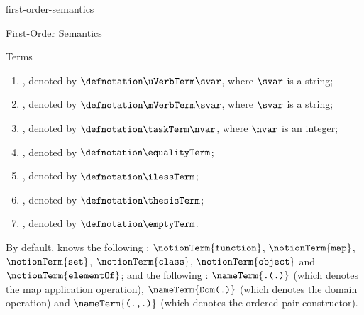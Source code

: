 \documentclass{stex}
\begin{document}
\begin{smodule}{first-order-semantics}
\begin{sfragment}[id=sec:first-order-semantics]{First-Order Semantics}
\begin{sfragment}[id=sec:terms]{Terms}
\begin{sparagraph}[style=symdoc,for={term name,nameTerm,symbolicTerm,theTerm,uAdjectiveTerm,mAdjectiveTerm,
    uVerbTerm,mVerbTerm,taskTerm,equalityTerm,ilessTerm,thesisTerm,emptyTerm}]
\begin{enumerate}
          where $\svar$ is a string;
        \item {}, denoted by $\defnotation\uVerbTerm\svar$,
          where $\svar$ is a string;
        \item {}, denoted by $\defnotation\mVerbTerm\svar$,
          where $\svar$ is a string;
        \item {}, denoted by $\defnotation\taskTerm\nvar$,
          where $\nvar$ is an integer;
        \item {}, denoted by $\defnotation\equalityTerm$;
        \item {}, denoted by $\defnotation\ilessTerm$;
        \item {}, denoted by $\defnotation\thesisTerm$;
        \item {}, denoted by $\defnotation\emptyTerm$.
      \end{enumerate}
    \end{sparagraph}

    By default, \Naproche knows the following :
    $\notionTerm{\texttt{function}}$,
    $\notionTerm{\texttt{map}}$,
    $\notionTerm{\texttt{set}}$,
    $\notionTerm{\texttt{class}}$,
    $\notionTerm{\texttt{object}}$ and
    $\notionTerm{\texttt{elementOf}}$;
    and the following :
    $\nameTerm{\texttt{.(.)}}$ (which denotes the map application operation),
    $\nameTerm{\texttt{Dom(.)}}$ (which denotes the domain operation) and
    $\nameTerm{\texttt{(.,.)}}$ (which denotes the ordered pair constructor).
  \end{sfragment}


\end{sfragment}
\end{smodule}
\end{document}
